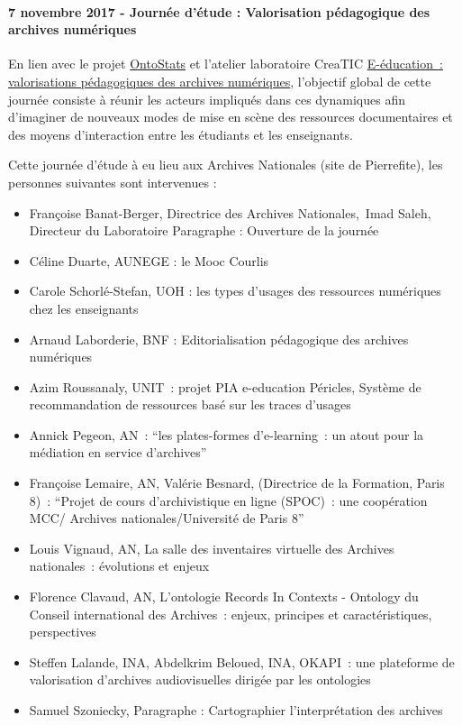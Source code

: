 \documentclass[
  a4paper,
  DIV=11,
  numbers=noendperiod]{scrreprt}
\let\oldparagraph\paragraph
\renewcommand{\paragraph}[1]{\oldparagraph{#1}\mbox{}}
\begin{document}
\paragraph{\texorpdfstring{7 novembre 2017 - \textbf{Journée d'étude} :
Valorisation pédagogique des archives
numériques}{7 novembre 2017 - Journée d'étude : Valorisation pédagogique des archives numériques}}\label{novembre-2017---journuxe9e-duxe9tude-valorisation-puxe9dagogique-des-archives-numuxe9riques}

En lien avec le projet
\href{http://www.ontostats.univ-paris8.fr/}{OntoStats} et l'atelier
laboratoire CreaTIC
\href{http://idefi-creatic.net/fr/ateliers-laboratoires/}{E-éducation~:
valorisations pédagogiques des archives numériques}, l'objectif global
de cette journée consiste à réunir les acteurs impliqués dans ces
dynamiques afin d'imaginer de nouveaux modes de mise en scène des
ressources documentaires et des moyens d'interaction entre les étudiants
et les enseignants.

Cette journée d'étude à eu lieu aux Archives Nationales (site de
Pierrefite), les personnes suivantes sont intervenues :

\begin{itemize}
\item
  Françoise Banat-Berger, Directrice des Archives Nationales,~Imad
  Saleh, Directeur du Laboratoire Paragraphe : Ouverture de la journée
\item
  Céline Duarte, AUNEGE : le Mooc Courlis
\item
  Carole Schorlé-Stefan, UOH : les types d'usages des ressources
  numériques chez les enseignants
\item
  Arnaud Laborderie, BNF : Editorialisation pédagogique des archives
  numériques
\item
  Azim Roussanaly, UNIT~: projet PIA e-education Péricles, Système de
  recommandation de ressources basé sur les traces d'usages
\item
  Annick Pegeon, AN~: ``les plates-formes d'e-learning~: un atout pour
  la médiation en service d'archives''
\item
  Françoise Lemaire, AN, Valérie Besnard, (Directrice de la Formation,
  Paris 8)~: ``Projet de cours d'archivistique en ligne (SPOC)~: une
  coopération MCC/ Archives nationales/Université de Paris 8''
\item
  Louis Vignaud, AN, La salle des inventaires virtuelle des Archives
  nationales~: évolutions et enjeux
\item
  Florence Clavaud, AN, L'ontologie Records In Contexts - Ontology du
  Conseil international des Archives~: enjeux, principes et
  caractéristiques, perspectives
\item
  Steffen Lalande, INA, Abdelkrim Beloued, INA, OKAPI~: une plateforme
  de valorisation d'archives audiovisuelles dirigée par les ontologies
\item
  Samuel Szoniecky, Paragraphe : Cartographier l'interprétation des
  archives
\end{itemize}
\end{document}
